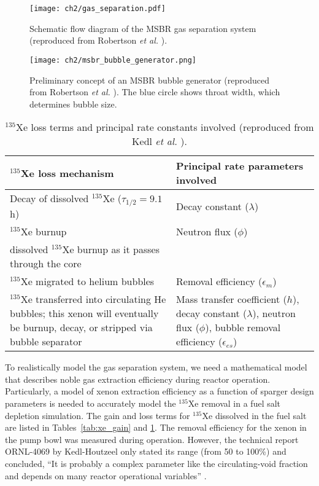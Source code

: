 \begin{figure}[htp!] %
	\centering
	\texttt{[image: ch2/gas\_separation.pdf]}
	\caption{Schematic flow diagram of the \gls{MSBR} gas separation system 
		(reproduced from Robertson \emph{et al.} 
		\cite{robertson_conceptual_1971}).}
	\label{fig:gas_removal_system}
\end{figure}
\begin{figure}[htp!] %
	\centering
	\texttt{[image: ch2/msbr\_bubble\_generator.png]}
	\caption{Preliminary concept of an \gls{MSBR} bubble generator (reproduced 
	from Robertson \emph{et al.} \cite{robertson_conceptual_1971}). 
	The blue circle shows throat width, which determines bubble size.}
	\vspace{-0.25in}
	\label{fig:bubble_separator}
\end{figure}
\begin{table}[t]
	\caption{$^{135}$Xe loss terms and principal rate constants involved
		(reproduced from Kedl \emph{et al.} \cite{kedl_development_1967}).}
	\centering
	\begin{tabularx}{\textwidth}{b b}
		\hline \textbf{$^{135}$Xe loss mechanism}      & \textbf{Principal 
			rate parameters involved}  	\\[5pt]
		\hline Decay of dissolved $^{135}$Xe ($\tau_{1/2}=9.1$ h)  & Decay 
		constant	($\lambda$)		\\[5pt]
		\hline $^{135}$Xe burnup              &  Neutron flux 
		($\phi$)		 					\\[5pt]
		dissolved $^{135}$Xe burnup as it passes through the core  
		& 			            \\		
		\hline $^{135}$Xe migrated to 
		helium bubbles & Removal efficiency 
		($\epsilon_m$)		\\[5pt]
		\hline $^{135}$Xe transferred into circulating He bubbles; this xenon 
		will eventually be burnup, decay, or stripped via bubble separator & 
		Mass transfer coefficient ($h$), decay constant ($\lambda$), 
		neutron flux ($\phi$), bubble removal efficiency 
		($\epsilon_{es}$)		\\[5pt]
		\hline 
	\end{tabularx}
	\label{tab:xe_loss}
\end{table}

To realistically model the gas separation system, we need a mathematical model 
that describes noble gas extraction efficiency during reactor operation. 
Particularly, a model of xenon extraction efficiency as a function of sparger 
design parameters is needed to accurately model the $^{135}$Xe removal in a 
fuel salt depletion simulation. The gain and loss terms for $^{135}$Xe 
dissolved in the fuel salt are listed in Tables~\ref{tab:xe_gain} and 
\ref{tab:xe_loss}. The removal efficiency for the xenon in the pump bowl was 
measured during  operation. However, the technical report 
ORNL-4069 by Kedl-Houtzeel only stated its range (from 50 to 100\%) and 
concluded, ``It is probably a complex parameter like the circulating-void 
fraction and depends on many reactor operational variables'' 
\cite{kedl_development_1967}. %

